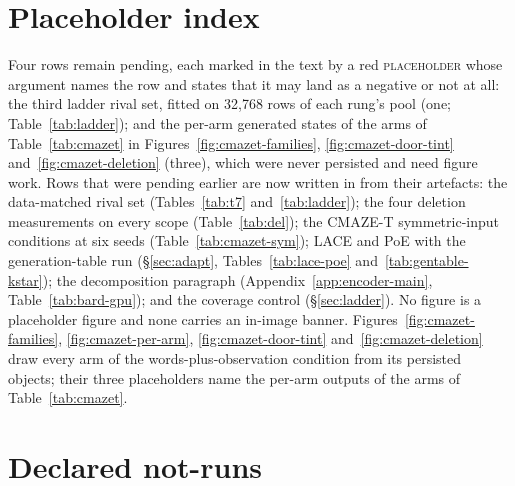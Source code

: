 \documentclass{article} %
\begin{document}
\section{Placeholder index}
\label{app:placeholders}

Four rows remain pending, each marked in the text by a red \textsc{placeholder} whose argument names
the row and states that it may land as a negative or not at all: the third ladder rival set, fitted
on 32,768 rows of each rung's pool (one; Table~\ref{tab:ladder}); and the per-arm generated states of %
the arms of Table~\ref{tab:cmazet} in Figures~\ref{fig:cmazet-families}, \ref{fig:cmazet-door-tint}
and~\ref{fig:cmazet-deletion} (three), which were never persisted and need figure work. Rows that
were pending earlier are now written in from their artefacts: the data-matched rival set
(Tables~\ref{tab:t7} and~\ref{tab:ladder}); the four deletion measurements on every scope
(Table~\ref{tab:del}); the CMAZE-T symmetric-input conditions at six seeds
(Table~\ref{tab:cmazet-sym}); LACE and PoE with the generation-table run (\S\ref{sec:adapt},
Tables~\ref{tab:lace-poe} and~\ref{tab:gentable-kstar}); the decomposition paragraph
(Appendix~\ref{app:encoder-main}, Table~\ref{tab:bard-gpu}); and the coverage control
(\S\ref{sec:ladder}). No figure is a placeholder figure and none carries an in-image banner.
Figures~\ref{fig:cmazet-families}, \ref{fig:cmazet-per-arm}, \ref{fig:cmazet-door-tint}
and~\ref{fig:cmazet-deletion} draw every arm of the words-plus-observation condition from its
persisted objects; their three placeholders name the per-arm outputs of the arms of
Table~\ref{tab:cmazet}.

\section{Declared not-runs}
\label{app:notrun}
\end{document}
